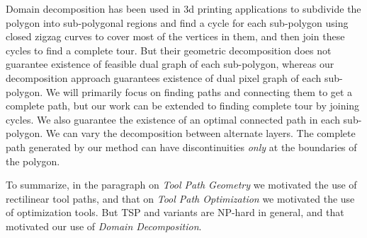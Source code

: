   Domain decomposition has been used in 3d printing applications \cite{DwKo2004,DiPaCuLi2014,JiHeFuZhDu2017} to subdivide the polygon into sub-polygonal regions and find a cycle for each sub-polygon using closed zigzag curves to cover most of the vertices in them, and then join these cycles to find a complete tour.
  But their geometric decomposition does not guarantee existence of feasible dual graph of each sub-polygon, whereas our decomposition approach guarantees existence of dual pixel graph of each sub-polygon.
  We will primarily focus on finding paths and connecting them to get a complete path, but our work can be extended to finding complete tour by joining cycles.
  We also guarantee the existence of an optimal connected path in each sub-polygon.
  We can vary the decomposition between alternate layers.
  The complete path generated by our method can have discontinuities \emph{only} at the boundaries of the polygon.
  
  To summarize, in the paragraph on \emph{Tool Path Geometry} we motivated the use of rectilinear tool paths, and that on \emph{Tool Path Optimization} we motivated the use of optimization tools.
  But TSP and variants are NP-hard in general, and that motivated our use of \emph{Domain Decomposition}.
  
